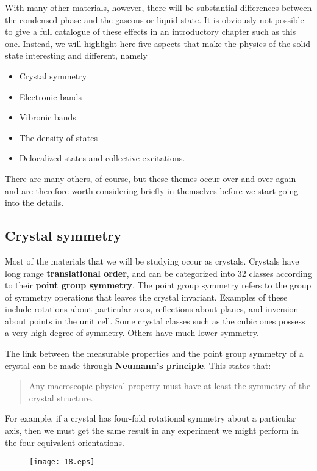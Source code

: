 \documentclass[12pt]{book}
\begin{document}
With many other materials, however, there will be substantial differences between the condensed phase and the gaseous or liquid state. It is obviously not possible to give a full catalogue of these effects in an introductory chapter such as this one. Instead, we will highlight here five aspects that make the physics of the solid state interesting and different, namely
\begin{itemize}
  \item Crystal symmetry
  \item Electronic bands
  \item Vibronic bands
  \item The density of states
  \item Delocalized states and collective excitations.
\end{itemize}
There are many others, of course, but these themes occur over and over again and are therefore worth considering briefly in themselves before we start going into the details.

\subsection{Crystal symmetry}

Most of the materials that we will be studying occur as crystals. Crystals have long range \textbf{translational order}, and can be categorized into 32 classes according to their \textbf{point group symmetry}. The point group symmetry refers to the group of symmetry operations that leaves the crystal invariant. Examples of these include rotations about particular axes, reflections about planes, and inversion about points in the unit cell. Some crystal classes such as the cubic ones possess a very high degree of symmetry. Others have much lower symmetry.

The link between the measurable properties and the point group symmetry of a crystal can be made through \textbf{Neumann's principle}. This states that:
\begin{quote}
  Any macroscopic physical property must have at least the symmetry of the crystal structure.
\end{quote}
For example, if a crystal has four-fold rotational symmetry about a particular axis, then we must get the same result in any experiment we might perform in the four equivalent orientations.
\begin{figure}[htbp]
  \texttt{[image: 18.eps]}\\
  \label{fig:1.8}
\end{figure}
\end{document}
